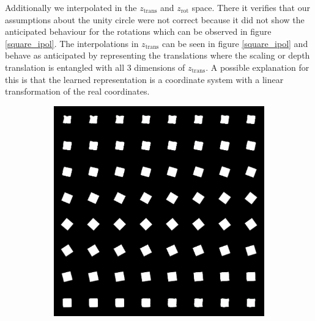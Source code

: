 \documentclass[10pt,a4paper]{article}
\newcommand{\rot}{\ensuremath{\text{rot}\xspace}}
\newcommand{\trans}{\ensuremath{\text{trans}\xspace}}
\begin{document}
Additionally we interpolated in the $z_{\trans}$ and $z_{\rot}$ space. There it verifies that our assumptions about the unity circle were not correct because it did not show the anticipated behaviour for the rotations which can be observed in figure \ref{square_ipol}.
The interpolations in $z_{\trans}$ can be seen in figure \ref{square_ipol} and behave as anticipated by representing the translations where the scaling or depth translation is entangled with all 3 dimensions of $z_{\trans}$. A possible explanation for this is that the learned representation is a coordinate system with a linear transformation of the real coordinates.\\  
\begin{figure}[!ht]
\centering
\begin{subfigure}{0.49\textwidth}
	\centering
	\includegraphics[width=\textwidth] {square_interpolation_theta.png}
	\caption{}
	\label{fig1:subim1}
\end{subfigure}
\begin{subfigure}{0.49\textwidth}
	\centering	

\end{subfigure}
\end{figure}
\end{document}
